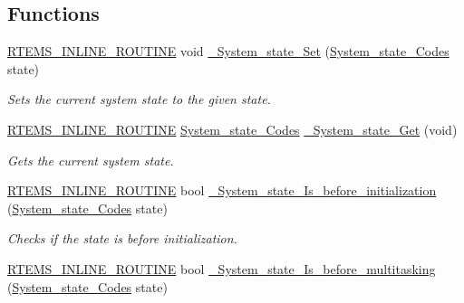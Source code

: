 \subsection*{Functions}
\begin{DoxyCompactItemize}
\item 
\mbox{\hyperlink{group__RTEMSScoreBaseDefs_gac216239df231d5dbd15e3520b0b9313f}{R\+T\+E\+M\+S\+\_\+\+I\+N\+L\+I\+N\+E\+\_\+\+R\+O\+U\+T\+I\+NE}} void \mbox{\hyperlink{group__RTEMSScoreSysState_gae619801bab42e4e750981529d3f41960}{\+\_\+\+System\+\_\+state\+\_\+\+Set}} (\mbox{\hyperlink{group__RTEMSScoreSysState_ga959824776c35a999ecd2720fde987d72}{System\+\_\+state\+\_\+\+Codes}} state)
\begin{DoxyCompactList}\small\item\em Sets the current system state to the given state. \end{DoxyCompactList}\item 
\mbox{\hyperlink{group__RTEMSScoreBaseDefs_gac216239df231d5dbd15e3520b0b9313f}{R\+T\+E\+M\+S\+\_\+\+I\+N\+L\+I\+N\+E\+\_\+\+R\+O\+U\+T\+I\+NE}} \mbox{\hyperlink{group__RTEMSScoreSysState_ga959824776c35a999ecd2720fde987d72}{System\+\_\+state\+\_\+\+Codes}} \mbox{\hyperlink{group__RTEMSScoreSysState_ga1f0777590280f354ba1a73b0b4ed143e}{\+\_\+\+System\+\_\+state\+\_\+\+Get}} (void)
\begin{DoxyCompactList}\small\item\em Gets the current system state. \end{DoxyCompactList}\item 
\mbox{\hyperlink{group__RTEMSScoreBaseDefs_gac216239df231d5dbd15e3520b0b9313f}{R\+T\+E\+M\+S\+\_\+\+I\+N\+L\+I\+N\+E\+\_\+\+R\+O\+U\+T\+I\+NE}} bool \mbox{\hyperlink{group__RTEMSScoreSysState_ga65c9b8a4aade0388329be8525be74dbd}{\+\_\+\+System\+\_\+state\+\_\+\+Is\+\_\+before\+\_\+initialization}} (\mbox{\hyperlink{group__RTEMSScoreSysState_ga959824776c35a999ecd2720fde987d72}{System\+\_\+state\+\_\+\+Codes}} state)
\begin{DoxyCompactList}\small\item\em Checks if the state is before initialization. \end{DoxyCompactList}\item 
\mbox{\hyperlink{group__RTEMSScoreBaseDefs_gac216239df231d5dbd15e3520b0b9313f}{R\+T\+E\+M\+S\+\_\+\+I\+N\+L\+I\+N\+E\+\_\+\+R\+O\+U\+T\+I\+NE}} bool \mbox{\hyperlink{group__RTEMSScoreSysState_ga33dc0405379029a7354816ee97fa237c}{\+\_\+\+System\+\_\+state\+\_\+\+Is\+\_\+before\+\_\+multitasking}} (\mbox{\hyperlink{group__RTEMSScoreSysState_ga959824776c35a999ecd2720fde987d72}{System\+\_\+state\+\_\+\+Codes}} state)

\end{DoxyCompactItemize}

